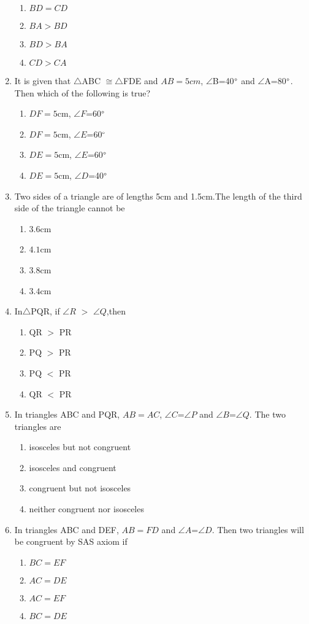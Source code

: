 \documentclass{article}
\begin{document}
\begin{enumerate}
\begin{enumerate}
\item $BD=CD$
\item $BA>BD$
\item $BD>BA$
\item $CD>CA$
\end{enumerate}
\item It is given that $\triangle$ABC $\cong$$\triangle$FDE and $AB=5cm$, $\angle$B=40$\degree$ and $\angle$A=80$\degree$. Then which of the following is true?
\begin{enumerate}
\item $DF=5$cm, $\angle F$=60$\degree$
\item $DF=5$cm, $\angle E$=60$\degree$
\item $DE=5$cm, $\angle E$=60$\degree$	
\item $DE=5$cm, $\angle D$=40$\degree$
\end{enumerate}		
\item Two sides of a triangle are of lengths 5cm and 1.5cm.The length of the third side of the triangle cannot be
\begin{enumerate}
\item $3.6$cm
\item $4.1$cm
\item $3.8$cm
\item $3.4$cm
\end{enumerate}
\item In$\triangle$PQR, if $\angle R$ $>$ $\angle Q$,then
\begin{enumerate}
\item QR $>$ PR
\item PQ $>$ PR
\item PQ $<$ PR
\item QR $<$ PR
\end{enumerate}
\item In triangles ABC and PQR, $AB=AC$, $\angle$$C$=$\angle$$P$ and $\angle$$B$=$\angle$$Q$. The two triangles are
\begin{enumerate}
\item isosceles but not congruent	
\item isosceles and congruent
\item congruent but not isosceles
\item neither congruent nor isosceles
\end{enumerate}
\item In triangles ABC and DEF, $AB=FD$ and $\angle$$A$=$\angle$$D$. Then two triangles will be congruent by SAS axiom if
\begin{enumerate}
\item $BC=EF$
\item $AC=DE$
\item $AC=EF$
\item $BC=DE$
\end{enumerate}
\end{enumerate}
\end{document}
